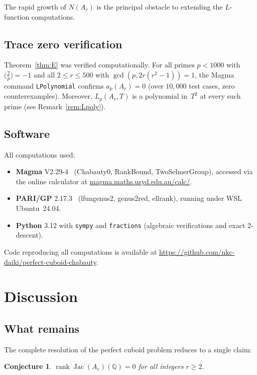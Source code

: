 \documentclass[11pt]{amsart}
\theoremstyle{plain}
\newtheorem{conjecture}[theorem]{Conjecture}
\theoremstyle{definition}
\theoremstyle{remark}
\newcommand{\QQ}{\mathbb{Q}}
\newcommand{\Jac}{\operatorname{Jac}}
\newcommand{\rank}{\operatorname{rank}}
\begin{document}
The rapid growth of $N(A_r)$ is the principal obstacle to extending the
$L$-function computations.

\subsection{Trace zero verification}

Theorem~\ref{thm:E} was verified computationally.  For all primes $p<1000$
with $\bigl(\frac{2}{p}\bigr)=-1$ and all $2\le r\le 500$ with
$\gcd(p,2r(r^2{-}1))=1$, the Magma command \texttt{LPolynomial} confirms
$a_p(A_r)=0$ (over $10{,}000$ test cases, zero counterexamples).
Moreover, $L_p(A_r,T)$ is a polynomial in~$T^2$ at every such prime
(see Remark~\ref{rem:Lpoly}).

\subsection{Software}

All computations used:
\begin{itemize}
\item \textbf{Magma} V2.29-4~\cite{Magma} (Chabauty0, RankBound, TwoSelmerGroup),
  accessed via the online calculator at
  \url{magma.maths.usyd.edu.au/calc/}.
\item \textbf{PARI/GP} 2.17.3~\cite{PARI} (lfungenus2, genus2red, ellrank),
  running under WSL Ubuntu~24.04.
\item \textbf{Python} 3.12 with \texttt{sympy} and \texttt{fractions} (algebraic
  verifications and exact 2-descent).
\end{itemize}
Code reproducing all computations is available at
\url{https://github.com/nkc-daiki/perfect-cuboid-chabauty}.


\section{Discussion}\label{sec:discussion}

\subsection{What remains}

The complete resolution of the perfect cuboid problem reduces to a single claim:

\begin{conjecture}\label{conj:rank}
$\rank\Jac(A_r)(\QQ)=0$ for all integers $r\ge 2$.
\end{conjecture}
\end{document}
